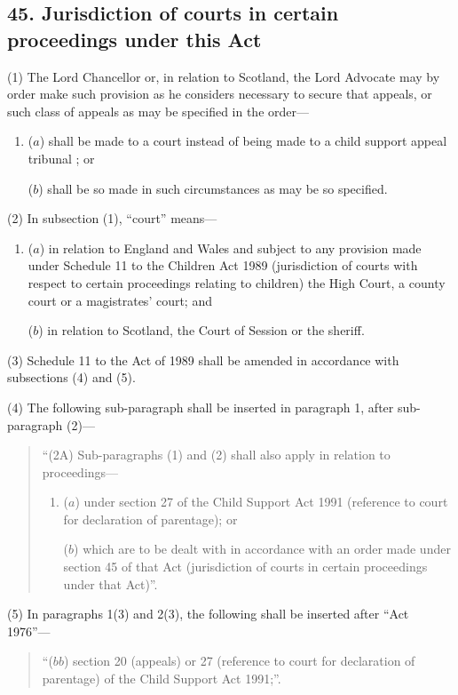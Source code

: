 \documentclass[12pt,a4paper]{article}
\begin{document}
\subsection{45. Jurisdiction of courts in certain proceedings under this Act}

(1) The Lord Chancellor or, in relation to Scotland, the Lord Advocate may by order make such provision as he considers necessary to secure that appeals, or such class of appeals as may be specified in the order—
\begin{enumerate}\item[]
($a$) shall be made to a court instead of being made to 
a child support appeal tribunal%
; or

($b$) shall be so made in such circumstances as may be so specified.
\end{enumerate}

(2) In subsection (1), “court” means—
\begin{enumerate}\item[]
($a$) in relation to England and Wales and subject to any provision made under Schedule 11 to the Children Act 1989 (jurisdiction of courts with respect to certain proceedings relating to children) the High Court, a county court or a magistrates' court; and

($b$) in relation to Scotland, the Court of Session or the sheriff.
\end{enumerate}

(3) Schedule 11 to the Act of 1989 shall be amended in accordance with subsections (4)  and (5).

(4) The following sub-paragraph shall be inserted in paragraph 1, after sub-paragraph (2)—
\begin{quotation}
“(2A) Sub-paragraphs (1)  and (2)  shall also apply in relation to proceedings—
\begin{enumerate}\item[]
($a$) under section 27 of the Child Support Act 1991 (reference to court for declaration of parentage); or

($b$) which are to be dealt with in accordance with an order made under section 45 of that Act (jurisdiction of courts in certain proceedings under that Act)”.
\end{enumerate}
\end{quotation}

(5) In paragraphs 1(3)  and 2(3), the following shall be inserted after “Act 1976”—
\begin{quotation}
“($bb$) section 20 (appeals) or 27 (reference to court for declaration of parentage) of the Child Support Act 1991;”.
\end{quotation}
\end{document}
